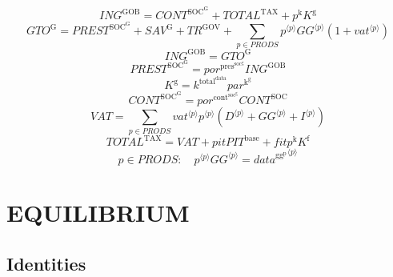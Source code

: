 \begin{equation}
{I\!N\!G}^{\mathrm{GOB}} = {C\!O\!N\!T}^{\mathrm{SOC}^{\mathrm{G}}} + {T\!O\!T\!A\!L}^{\mathrm{TAX}} + {p^{\mathrm{k}}} {K^{\mathrm{g}}}
\end{equation}
\begin{equation}
{G\!T\!O}^{\mathrm{G}} = {P\!R\!E\!S\!T}^{\mathrm{SOC}^{\mathrm{G}}} + {S\!A\!V}^{\mathrm{G}} + {T\!R}^{\mathrm{GOV}} + \sum_{p\in {P\!R\!O\!D\!S}} {{p}^{\langle p\rangle}} {{{G\!G}}^{\langle p\rangle}} \left(1 + {{v\!a\!t}}^{\langle p\rangle}\right)
\end{equation}
\begin{equation}
{I\!N\!G}^{\mathrm{GOB}} = {G\!T\!O}^{\mathrm{G}}
\end{equation}
\begin{equation}
{P\!R\!E\!S\!T}^{\mathrm{SOC}^{\mathrm{G}}} = {{p\!o\!r}^{\mathrm{pres}^{\mathrm{soc}^{\mathrm{g}}}}} {{I\!N\!G}^{\mathrm{GOB}}}
\end{equation}
\begin{equation}
K^{\mathrm{g}} = {k^{\mathrm{total}^{\mathrm{data}}}} {{p\!a\!r}^{\mathrm{k}^{\mathrm{g}}}}
\end{equation}
\begin{equation}
{C\!O\!N\!T}^{\mathrm{SOC}^{\mathrm{G}}} = {{p\!o\!r}^{\mathrm{cont}^{\mathrm{soc}^{\mathrm{g}}}}} {{C\!O\!N\!T}^{\mathrm{SOC}}}
\end{equation}
\begin{equation}
{V\!A\!T} = \sum_{p\in {P\!R\!O\!D\!S}} {{{v\!a\!t}}^{\langle p\rangle}} {{p}^{\langle p\rangle}} \left({D}^{\langle p\rangle} + {{G\!G}}^{\langle p\rangle} + {I}^{\langle p\rangle}\right)
\end{equation}
\begin{equation}
{T\!O\!T\!A\!L}^{\mathrm{TAX}} = {V\!A\!T} + {{p\!i\!t}} {{P\!I\!T}^{\mathrm{base}}} + {{f\!i\!t}} {p^{\mathrm{k}}} {K^{\mathrm{f}}}
\end{equation}
\begin{equation}
p\in {P\!R\!O\!D\!S}\colon\quad {{p}^{\langle p\rangle}} {{{G\!G}}^{\langle p\rangle}} = {{d\!a\!t\!a}^{\mathrm{gg}^{\mathrm{p}}}}^{\langle p\rangle}
\end{equation}




\section{EQUILIBRIUM}

\subsection{Identities}

